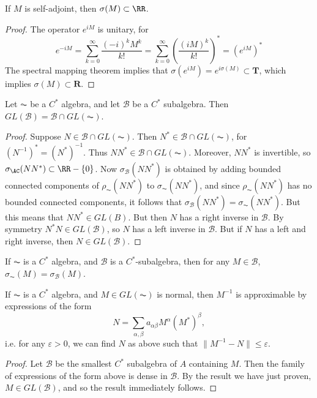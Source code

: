 \begin{prop}
    If $M$ is self-adjoint, then $\sigma(M) \subset \RR$.
\end{prop}
\begin{proof}
    The operator $e^{iM}$ is unitary, for
    \[ e^{-iM} = \sum_{k = 0}^\infty \frac{(-i)^k M^k}{k!} = \sum_{k = 0}^\infty \left( \frac{(iM)^k}{k!} \right)^* = (e^{iM})^* \]
    The spectral mapping theorem implies that $\sigma(e^{iM}) = e^{i \sigma(M)} \subset \mathbf{T}$, which implies $\sigma(M) \subset \mathbf{R}$.
\end{proof}

\begin{corollary}
    Let $\AC$ be a $C^*$ algebra, and let $\mathcal{B}$ be a $C^*$ subalgebra. Then $GL(\mathcal{B}) = \mathcal{B} \cap GL(\AC)$.
\end{corollary}
\begin{proof}
    Suppose $N \in \mathcal{B} \cap GL(\AC)$. Then $N^* \in \mathcal{B} \cap GL(\AC)$, for $(N^{-1})^* = (N^*)^{-1}$. Thus $NN^* \in \mathcal{B} \cap GL(\AC)$. Moreover, $NN^*$ is invertible, so $\sigma_{\AC}(NN^*) \subset \RR - \{ 0 \}$. Now $\sigma_{\mathcal{B}}(NN^*)$ is obtained by adding bounded connected components of $\rho_{\AC}(NN^*)$ to $\sigma_{\AC}(NN^*)$, and since $\rho_{\AC}(NN^*)$ has no bounded connected components, it follows that $\sigma_{\mathcal{B}}(NN^*) = \sigma_{\AC}(NN^*)$. But this means that $NN^* \in GL(B)$. But then $N$ has a right inverse in $\mathcal{B}$. By symmetry $N^*N \in GL(\mathcal{B})$, so $N$ has a left inverse in $\mathcal{B}$. But if $N$ has a left and right inverse, then $N \in GL(\mathcal{B})$.
\end{proof}

\begin{corollary}
    If $\AC$ is a $C^*$ algebra, and $\mathcal{B}$ is a $C^*$-subalgebra, then for any $M \in \mathcal{B}$, $\sigma_{\AC}(M) = \sigma_{\mathcal{B}}(M)$.
\end{corollary}

\begin{corollary}
    If $\AC$ is a $C^*$ algebra, and $M \in GL(\AC)$ is normal, then $M^{-1}$ is approximable by expressions of the form
    \[ N = \sum_{\alpha, \beta} a_{\alpha \beta} M^\alpha (M^*)^\beta, \]
    i.e. for any $\varepsilon > 0$, we can find $N$ as above such that $\| M^{-1} - N \| \leq \varepsilon$.
\end{corollary}
\begin{proof}
    Let $\mathcal{B}$ be the smallest $C^*$ subalgebra of $A$ containing $M$. Then the family of expressions of the form above is dense in $\mathcal{B}$. By the result we have just proven, $M \in GL(\mathcal{B})$, and so the result immediately follows.
\end{proof}

